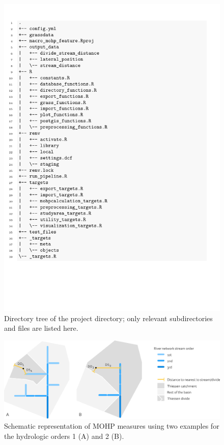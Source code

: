 \documentclass[fleqn,10pt]{wlscirep}
\begin{document}
\begin{figure}[H]

{\centering \includegraphics[width=0.7\linewidth]{data_descriptor/tex/directory_tree} 

}

\caption{Directory tree of the project directory; only relevant subdirectories and files are listed here.}\label{fig:projectdirtree}
\end{figure}

\normalsize

\footnotesize

\begin{figure}[H]

{\centering \includegraphics[width=1\linewidth]{data_descriptor/tex/mohp_scheme} 

}

\caption{Schematic representation of MOHP measures using two examples for the hydrologic orders 1 (A) and 2 (B).}\label{fig:schematicmohp}
\end{figure}
\end{document}
